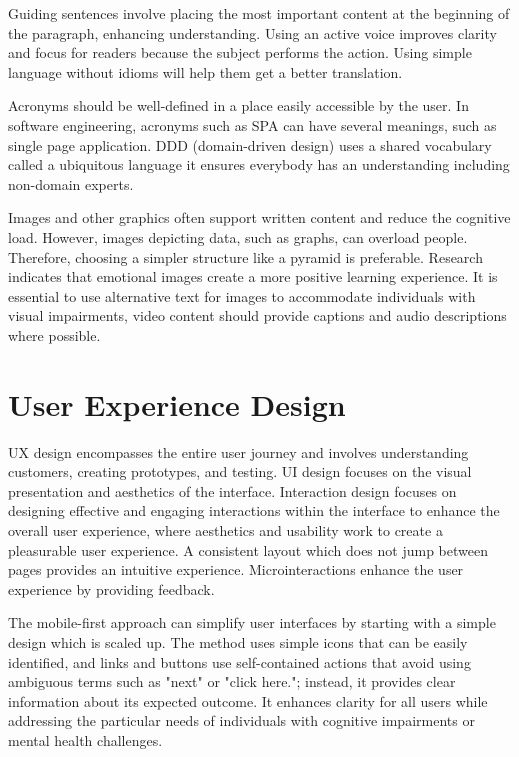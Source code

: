 \documentclass[main.tex]{subfiles}
\begin{document}
Guiding sentences involve placing the most important content at the beginning of the paragraph, enhancing understanding. Using an active voice improves clarity and focus for readers because the subject performs the action. Using simple language without idioms will help them get a better translation. 

Acronyms should be well-defined in a place easily accessible by the user. In software engineering, acronyms such as SPA can have several meanings, such as single page application. DDD (domain-driven design) uses a shared vocabulary called a ubiquitous language it ensures everybody has an understanding including non-domain experts.

Images and other graphics often support written content and reduce the cognitive load. However, images depicting data, such as graphs, can overload people. Therefore, choosing a simpler structure like a pyramid is preferable. Research indicates that emotional images create a more positive learning experience. It is essential to use alternative text for images to accommodate individuals with visual impairments, video content should provide captions and audio descriptions where possible.


\section{User Experience Design}

 UX design encompasses the entire user journey and involves understanding customers, creating prototypes, and testing. UI design focuses on the visual presentation and aesthetics of the interface. Interaction design focuses on designing effective and engaging interactions within the interface to enhance the overall user experience, where aesthetics and usability work to create a pleasurable user experience. A consistent layout which does not jump between pages provides an intuitive experience. Microinteractions enhance the user experience by providing feedback. 

The mobile-first approach can simplify user interfaces by starting with a simple design which is scaled up. The method uses simple icons that can be easily identified, and links and buttons use self-contained actions that avoid using ambiguous terms such as "next" or "click here."; instead, it provides clear information about its expected outcome. It enhances clarity for all users while addressing the particular needs of individuals with cognitive impairments or mental health challenges.  
\end{document}
